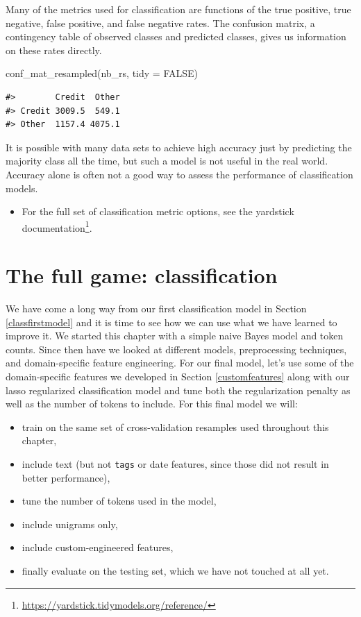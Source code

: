 \documentclass[
]{krantz}
\makeatletter
\newenvironment{Shaded}{\begin{snugshade}}{\end{snugshade}}
\newcommand{\AttributeTok}[1]{\textcolor[rgb]{0.77,0.63,0.00}{#1}}
\newcommand{\ConstantTok}[1]{\textcolor[rgb]{0.00,0.00,0.00}{#1}}
\newcommand{\FunctionTok}[1]{\textcolor[rgb]{0.00,0.00,0.00}{#1}}
\newcommand{\NormalTok}[1]{#1}
\DeclareRobustCommand{\href}[2]{#2\footnote{\url{#1}}}
\renewcommand{\href}[2]{#2\footnote{\url{#1}}}
\newenvironment{kframe}{%
\medskip{}
\setlength{\fboxsep}{.8em}
 \def\at@end@of@kframe{}%
 \ifinner\ifhmode%
  \def\at@end@of@kframe{\end{minipage}}%
  \begin{minipage}{\columnwidth}%
 \fi\fi%
 \def\FrameCommand##1{\hskip\@totalleftmargin \hskip-\fboxsep
 \colorbox{shadecolor}{##1}\hskip-\fboxsep
     \hskip-\linewidth \hskip-\@totalleftmargin \hskip\columnwidth}%
 \MakeFramed {\advance\hsize-\width
   \@totalleftmargin\z@ \linewidth\hsize
   \@setminipage}}%
 {\par\unskip\endMakeFramed%
 \at@end@of@kframe}
\renewenvironment{Shaded}{\begin{kframe}}{\end{kframe}}
\newenvironment{rmdblock}[1]
  {\begin{shaded*}
  \begin{itemize}[left = -1cm, labelsep = 1cm]
  \renewcommand{\labelitemi}{
    \raisebox{-.7\height}[0pt][0pt]{
      {\setkeys{Gin}{width=3em,keepaspectratio}\texttt{[image: images/\#1]}}
    }
  }
 
  \item
  }
  {
  \end{itemize}
  \end{shaded*}
  }
\newenvironment{rmdnote}
  {\begin{rmdblock}{note}}
  {\end{rmdblock}}
\makeatother
\begin{document}
Many of the metrics used for classification are functions of the true positive, true negative, false positive, and false negative rates.
The confusion matrix, a contingency table of observed classes and predicted classes, gives us information on these rates directly.

\begin{Shaded}
\begin{Highlighting}[]
\FunctionTok{conf\_mat\_resampled}\NormalTok{(nb\_rs, }\AttributeTok{tidy =} \ConstantTok{FALSE}\NormalTok{)}
\end{Highlighting}
\end{Shaded}

\begin{verbatim}
#>        Credit  Other
#> Credit 3009.5  549.1
#> Other  1157.4 4075.1
\end{verbatim}

It is possible with many data sets to achieve high accuracy just by predicting the majority class all the time, but such a model is not useful in the real world. Accuracy alone is often not a good way to assess the performance of classification models.

\begin{rmdnote}
For the full set of classification metric options, see the
\href{https://yardstick.tidymodels.org/reference/}{yardstick
documentation}.
\end{rmdnote}

\hypertarget{mlclassificationfull}{%
\section{The full game: classification}\label{mlclassificationfull}}

We have come a long way from our first classification model in Section \ref{classfirstmodel} and it is time to see how we can use what we have learned to improve it.
We started this chapter with a simple naive Bayes model and token counts.
Since then have we looked at different models, preprocessing techniques, and domain-specific feature engineering.
For our final model, let's use some of the domain-specific features we developed in Section \ref{customfeatures} along with our lasso regularized classification model and tune both the regularization penalty as well as the number of tokens to include. For this final model we will:

\begin{itemize}
\item
  train on the same set of cross-validation resamples used throughout this chapter,
\item
  include text (but not \texttt{tags} or date features, since those did not result in better performance),
\item
  tune the number of tokens used in the model,
\item
  include unigrams only,
\item
  include custom-engineered features,
\item
  finally evaluate on the testing set, which we have not touched at all yet.
\end{itemize}
\end{document}
